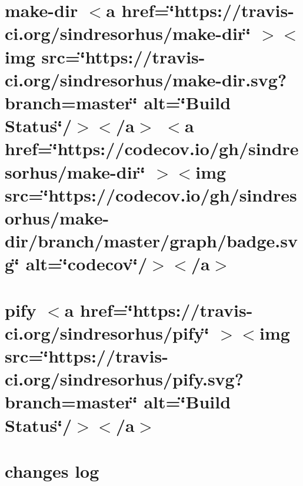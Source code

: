 \documentclass[twoside]{book}
\newcommand{\+}{\discretionary{\mbox{\scriptsize$\hookleftarrow$}}{}{}}
\begin{document}
\chapter{make-\/dir \texorpdfstring{$<$}{<}a href=\char`\"{}https\+://travis-\/ci.\+org/sindresorhus/make-\/dir\char`\"{} \texorpdfstring{$>$}{>}\texorpdfstring{$<$}{<}img src=\char`\"{}https\+://travis-\/ci.\+org/sindresorhus/make-\/dir.\+svg?branch=master\char`\"{} alt=\char`\"{}\+Build Status\char`\"{}/\texorpdfstring{$>$}{>}\texorpdfstring{$<$}{<}/a\texorpdfstring{$>$}{>} \texorpdfstring{$<$}{<}a href=\char`\"{}https\+://codecov.\+io/gh/sindresorhus/make-\/dir\char`\"{} \texorpdfstring{$>$}{>}\texorpdfstring{$<$}{<}img src=\char`\"{}https\+://codecov.\+io/gh/sindresorhus/make-\/dir/branch/master/graph/badge.\+svg\char`\"{} alt=\char`\"{}codecov\char`\"{}/\texorpdfstring{$>$}{>}\texorpdfstring{$<$}{<}/a\texorpdfstring{$>$}{>}}
\label{md__c___users_vaishnavi_jadhav__desktop__developer_code_mean_stack_example_client_node_modules_le8e11c6bb8e5255e42de5b963b17a1a1}

\chapter{pify \texorpdfstring{$<$}{<}a href=\char`\"{}https\+://travis-\/ci.\+org/sindresorhus/pify\char`\"{} \texorpdfstring{$>$}{>}\texorpdfstring{$<$}{<}img src=\char`\"{}https\+://travis-\/ci.\+org/sindresorhus/pify.\+svg?branch=master\char`\"{} alt=\char`\"{}\+Build Status\char`\"{}/\texorpdfstring{$>$}{>}\texorpdfstring{$<$}{<}/a\texorpdfstring{$>$}{>}}
\label{md__c___users_vaishnavi_jadhav__desktop__developer_code_mean_stack_example_client_node_modules_less_node_modules_pify_readme}

\chapter{changes log}
\label{md__c___users_vaishnavi_jadhav__desktop__developer_code_mean_stack_example_client_node_modules_lbe998c74f365b6412eecd317022ff550}

\end{document}
